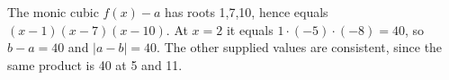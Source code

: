 The monic cubic $f(x)-a$ has roots 1,7,10, hence equals $(x-1)(x-7)(x-10)$. At $x=2$ it equals $1\cdot(-5)\cdot(-8)=40$, so $b-a=40$ and $\boxed{|a-b|=40}$. The other supplied values are consistent, since the same product is 40 at 5 and 11.
